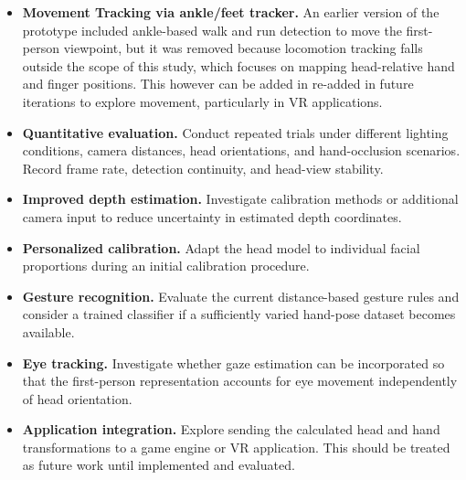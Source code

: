 \documentclass[12pt,a4paper]{article}
\begin{document}
\begin{itemize}
    \item
    \textbf{Movement Tracking via ankle/feet tracker.} An earlier version of the prototype included ankle-based walk and run detection to move the first-person viewpoint, but it was removed because locomotion tracking falls outside the scope of this study, which focuses on mapping head-relative hand and finger positions. This however can be added in re-added in future iterations to explore movement, particularly in VR applications.
    
    \item \textbf{Quantitative evaluation.} Conduct repeated trials under different lighting conditions, camera distances, head orientations, and hand-occlusion scenarios. Record frame rate, detection continuity, and head-view stability.
    \item \textbf{Improved depth estimation.} Investigate calibration methods or additional camera input to reduce uncertainty in estimated depth coordinates.
    \item \textbf{Personalized calibration.} Adapt the head model to individual facial proportions during an initial calibration procedure.
    \item \textbf{Gesture recognition.} Evaluate the current distance-based gesture rules and consider a trained classifier if a sufficiently varied hand-pose dataset becomes available.
    \item \textbf{Eye tracking.} Investigate whether gaze estimation can be incorporated so that the first-person representation accounts for eye movement independently of head orientation.
    \item \textbf{Application integration.} Explore sending the calculated head and hand transformations to a game engine or VR application. This should be treated as future work until implemented and evaluated.
\end{itemize}
\end{document}
